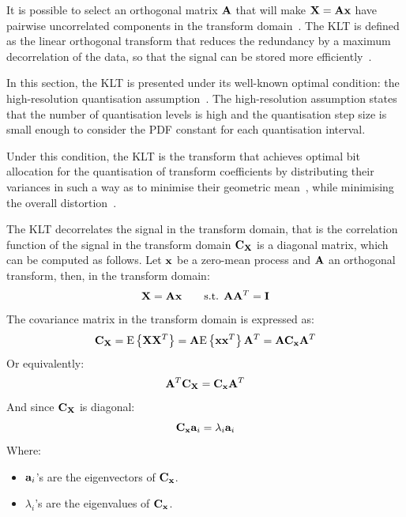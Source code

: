 \documentclass[11pt,a4paper,openright,twoside]{book}
\numberwithin{equation}{section} %
\numberwithin{figure}{section} %
\numberwithin{table}{section} %
\begin{document}
It is possible to select an orthogonal matrix $\mathbf{A}$ that will make $\mathbf{X}=\mathbf{A}\mathbf{x}$
have pairwise uncorrelated components in the transform
domain~\cite{gersho-92-vector-quantization}.
The \ac{KLT} is defined as the linear orthogonal transform that reduces the
redundancy by a maximum decorrelation of the data, so that the signal can be
stored more efficiently~\cite{rao-01-transform-data-compression-book}.

In this section, the \ac{KLT} is presented under its well-known optimal
condition:
the high-resolution quantisation assumption~\cite{goyal-00-high-resolution}.
The high-resolution assumption states that the number of quantisation levels
is high and the quantisation step size is small enough to consider the
\ac{PDF} constant for each quantisation interval.

Under this condition, the \ac{KLT} is the transform that achieves optimal
bit allocation for the quantisation of transform coefficients by distributing
their variances in such a way as to minimise their geometric
mean~\cite{jayant-84-digital-coding-waveforms}, while minimising the overall
distortion~\cite{gersho-92-vector-quantization}.

The \ac{KLT} decorrelates the signal in the transform domain, that is the
correlation function of the signal in the transform domain $\mathbf{C}_{\mathbf{X}}$ is a
diagonal matrix, which can be computed as follows.
Let $\mathbf{x}$ be a zero-mean process and $\mathbf{A}$ an orthogonal transform, then, in
the transform domain:
\begin{equation}
	\mathbf{X} = \mathbf{A} \mathbf{x} \qquad \text{s.t. } \mathbf{A} \mathbf{A}^T = \mathbf{I}
\end{equation}
The covariance matrix in the transform domain is expressed as:
\begin{equation}
	\mathbf{C}_{\mathbf{X}} = \text{E}\left\{\mathbf{X} \mathbf{X}^T\right\} = \mathbf{A} \text{E}\left\{\mathbf{x}\mathbf{x}^T\right\}\mathbf{A}^T =
	\mathbf{A}\mathbf{C}_{\mathbf{x}}\mathbf{A}^T
\end{equation}
Or equivalently:
\begin{equation}
	\mathbf{A}^T\mathbf{C}_{\mathbf{X}} = \mathbf{C}_{\mathbf{x}}\mathbf{A}^T
\end{equation}
And since $\mathbf{C}_{\mathbf{X}}$ is diagonal:
\begin{equation}
	\mathbf{C}_{\mathbf{x}} \mathbf{a}_i = \lambda_i\mathbf{a}_i
\end{equation}
Where:
\begin{itemize}
	\item $\mathbf{a}_i$'s are the eigenvectors of $\mathbf{C}_{\mathbf{x}}$.
	\item $\lambda_i$'s are the eigenvalues of $\mathbf{C}_{\mathbf{x}}$.
\end{itemize}
\end{document}
